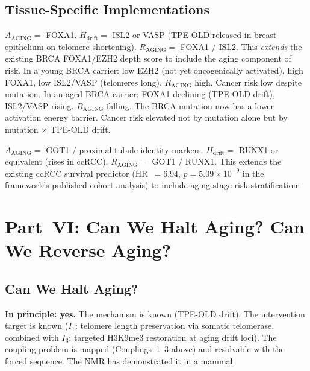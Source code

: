 \documentclass[12pt,a4paper]{article}
\newcommand{\raging}{$R_{\mathrm{AGING}}$}
\newcommand{\tpeold}{TPE-OLD}
\newcommand{\Inet}[1]{$I_{#1}$}
\begin{document}
\subsection{Tissue-Specific Implementations}

\begin{description}[leftmargin=2em, itemsep=0.5em]
  \item[\textbf{Breast (BRCA risk surveillance):}]
    $A_{\mathrm{AGING}} = $ FOXA1. $H_{\mathrm{drift}} = $ ISL2 or VASP
    (\tpeold{}-released in breast epithelium on telomere shortening).
    $R_{\mathrm{AGING}} = $ FOXA1 / ISL2. This \textit{extends} the existing
    BRCA FOXA1/EZH2 depth score to include the aging component of risk.
    In a young BRCA carrier: low EZH2 (not yet oncogenically activated),
    high FOXA1, low ISL2/VASP (telomeres long). \raging{} high. Cancer
    risk low despite mutation. In an aged BRCA carrier: FOXA1 declining
    (TPE-OLD drift), ISL2/VASP rising. \raging{} falling. The BRCA mutation
    now has a lower activation energy barrier. Cancer risk elevated not by
    mutation alone but by mutation $\times$ \tpeold{} drift.

  \item[\textbf{Renal (ccRCC surveillance):}]
    $A_{\mathrm{AGING}} = $ GOT1 / proximal tubule identity markers.
    $H_{\mathrm{drift}} = $ RUNX1 or equivalent (rises in ccRCC).
    $R_{\mathrm{AGING}} = $ GOT1 / RUNX1. This extends the existing ccRCC
    survival predictor (HR~$= 6.94$, $p = 5.09 \times 10^{-9}$ in the
    framework's published cohort analysis) to include aging-stage risk
    stratification.
\end{description}

\section{Part~VI: Can We Halt Aging? Can We Reverse Aging?}

\subsection{Can We Halt Aging?}

\textbf{In principle: yes.} The mechanism is known (TPE-OLD drift). The
intervention target is known (\Inet{1}: telomere length preservation via
somatic telomerase, combined with \Inet{3}: targeted H3K9me3 restoration at
aging drift loci). The coupling problem is mapped (Couplings~1--3 above) and
resolvable with the forced sequence. The NMR has demonstrated it in a mammal.
\end{document}
